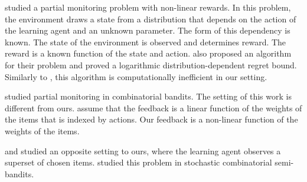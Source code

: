 \citet{agrawal89asymptotically} studied a partial monitoring problem with non-linear rewards. In this problem, the environment draws a state from a distribution that depends on the action of the learning agent and an unknown parameter. The form of this dependency is known. The state of the environment is observed and determines reward. The reward is a known function of the state and action. \citet{agrawal89asymptotically} also proposed an algorithm for their problem and proved a logarithmic distribution-dependent regret bound. Similarly to \citet{bartok12adaptive}, this algorithm is computationally inefficient in our setting.

\citet{lin14combinatorial} studied partial monitoring in combinatorial bandits. The setting of this work is different from ours. \citet{lin14combinatorial} assume that the feedback is a linear function of the weights of the items that is indexed by actions. Our feedback is a non-linear function of the weights of the items.

\citet{mannor11bandits} and \citet{caron12leveraging} studied an opposite setting to ours, where the learning agent observes a superset of chosen items. \citet{chen14combinatorial} studied this problem in stochastic combinatorial semi-bandits.
